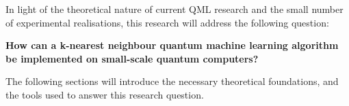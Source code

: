 



In light of the theoretical nature of current QML research and the small number of experimental realisations, this research will address the following question:

\centering\textbf{How can a k-nearest neighbour quantum machine learning algorithm be implemented on small-scale quantum computers?}


\justify
The following sections will introduce the necessary theoretical foundations, and the tools used to answer this research question. 
